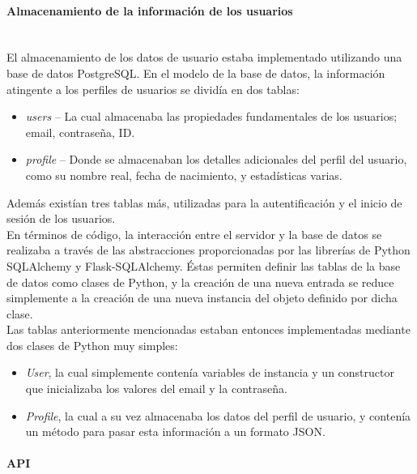 \documentclass[11pt,letterpaper]{article}
\begin{document}
\paragraph{Almacenamiento de la información de los usuarios\\\\}

El almacenamiento de los datos de usuario estaba implementado utilizando una base de datos PostgreSQL.
En el modelo de la base de datos, la información atingente a los perfiles de usuarios se dividía en dos tablas:

\begin{itemize}
    \item \emph{users} -- La cual almacenaba las propiedades fundamentales de los usuarios; email, contraseña, ID.
    \item \emph{profile} -- Donde se almacenaban los detalles adicionales del perfil del usuario, como su nombre real, fecha de nacimiento, y estadísticas varias.
\end{itemize}

Además existían tres tablas más, utilizadas para la autentificación y el inicio de sesión de los usuarios.\\

En términos de código, la interacción entre el servidor y la base de datos se realizaba a través de las abstracciones proporcionadas por las librerías de Python SQLAlchemy y Flask-SQLAlchemy. Éstas permiten definir las tablas de la base de datos como clases de Python, y la creación de una nueva entrada se reduce simplemente a la creación de una nueva instancia del objeto definido por dicha clase.\\
Las tablas anteriormente mencionadas estaban entonces implementadas mediante dos clases de Python muy simples:
\begin{itemize}
    \item \emph{User}, la cual simplemente contenía variables de instancia y un constructor que inicializaba los valores del email y la contraseña.
    \item \emph{Profile}, la cual a su vez almacenaba los datos del perfil de usuario, y contenía un método para pasar esta información a un formato JSON.
\end{itemize}
\newpage
\paragraph{API\\\\}
\end{document}
